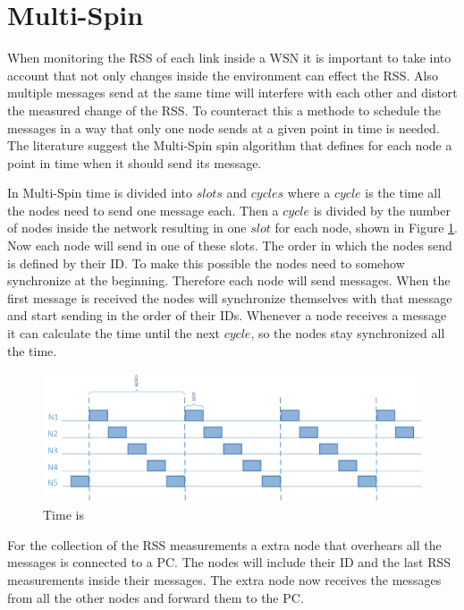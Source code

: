 \section{Multi-Spin}
When monitoring the RSS of each link inside a WSN it is important to take into account that not only changes inside the environment can effect the RSS. Also multiple messages send at the same time will interfere with each other and distort the measured change of the RSS. To counteract this a methode to schedule the messages in a way that only one node sends at a given point in time is needed. The literature suggest the Multi-Spin spin algorithm that defines for each node a point in time when it should send its message.

In Multi-Spin time is divided into $slots$ and $cycles$ where a $cycle$ is the time all the nodes need to send one message each. Then a $cycle$ is divided by the number of nodes inside the network resulting in one $slot$ for each node, shown in Figure \ref{fig:multi}. Now each node will send in one of these slots. The order in which the nodes send is defined by their ID. To make this possible the nodes need to somehow synchronize at the beginning. Therefore each node will send messages. When the first message is received the nodes will synchronize themselves with that message and start sending in the order of their IDs. Whenever a node receives a message it can calculate the time until the next $cycle$, so the nodes stay synchronized all the time.  \cite{RtiMulti}

\begin{figure}[htbp]
	\centering
    \includegraphics[scale=0.8]{content/images/Multispin}
   	\caption{Time is  \cite{RtiMulti}}
    \label{fig:multi}
\end{figure}

For the collection of the RSS measurements a extra node that overhears all the messages is connected to a PC. The nodes will include their ID and the last RSS measurements inside their messages. The extra node now receives the messages from all the other nodes and forward them to the PC.  \cite{RtiMulti}

